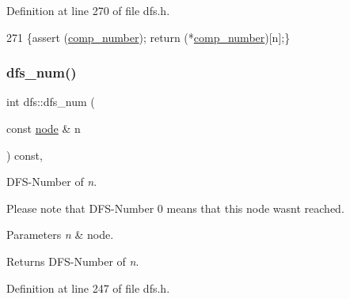 Definition at line 270 of file dfs.\+h.


\begin{DoxyCode}
271     \{assert (\mbox{\hyperlink{classdfs_a00db016ac7eab69045cae408008890c1}{comp\_number}}); \textcolor{keywordflow}{return} (*\mbox{\hyperlink{classdfs_a00db016ac7eab69045cae408008890c1}{comp\_number}})[n];\}
\end{DoxyCode}
\mbox{\label{classdfs_a315f16831a0bd333960e87e045cb37c8}} 
\subsubsection{\texorpdfstring{dfs\+\_\+num()}{dfs\_num()}}
{\footnotesize\ttfamily int dfs\+::dfs\+\_\+num (\begin{DoxyParamCaption}\item[{const \mbox{\hyperlink{classnode}{node}} \&}]{n }\end{DoxyParamCaption}) const\hspace{0.3cm}{\ttfamily [inline]}, {\ttfamily [inherited]}}



D\+F\+S-\/\+Number of {\itshape n}. 

Please note that D\+F\+S-\/\+Number 0 means that this node wasn\textquotesingle{}t reached.


\begin{DoxyParams}{Parameters}
{\em n} & node. \\
\hline
\end{DoxyParams}
\begin{DoxyReturn}{Returns}
D\+F\+S-\/\+Number of {\itshape n}. 
\end{DoxyReturn}


Definition at line 247 of file dfs.\+h.


